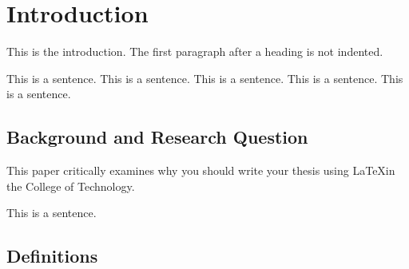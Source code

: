 %
%
%
%
%


\chapter{Introduction}

This is the introduction.
The first paragraph after a heading is not indented.

This is a sentence.
This is a sentence.
This is a sentence.
This is a sentence.
This is a sentence.


\section{Background and Research Question}

This paper critically examines why you should write your thesis using \LaTeX in the College of Technology.

This is a sentence.


\section{Definitions}

